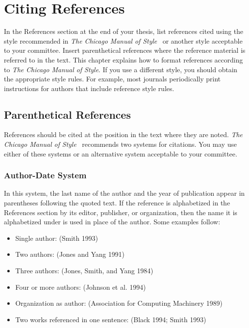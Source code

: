 \chapter{Citing References}
\label{cpt:citation}

In the References section at the end of your thesis, list references cited
using the style recommended in \textit{The Chicago Manual of
Style}~\cite{ChicagoManual} or another style acceptable to your committee.
Insert parenthetical references where the reference material is referred to in
the text.  This chapter explains how to format references according to
\textit{The Chicago Manual of Style}.  If you use a different style, you should
obtain the appropriate style rules.  For example, most journals periodically
print instructions for authors that include reference style rules.

\section{Parenthetical References}

References should be cited at the position in the text where they are noted.
\textit{The Chicago Manual of Style}~\cite{ChicagoManual} recommends two
systems for citations.  You may use either of these systems or an alternative
system acceptable to your committee.

\subsection{Author-Date System}

In this system, the last name of the author and the year of
publication appear in parentheses following the quoted text.  If the
reference is alphabetized in the References section by its editor,
publisher, or organization, then the name it is alphabetized under is
used in place of the author.  Some examples follow:
\begin{itemize}
 \item Single author: (Smith 1993)
 \item Two authors: (Jones and Yang 1991)
 \item Three authors: (Jones, Smith, and Yang 1984)
 \item Four or more authors: (Johnson et al. 1994)
 \item Organization as author: (Association for Computing Machinery 1989)
 \item Two works referenced in one sentence: (Black 1994; Smith 1993)
\end{itemize}

